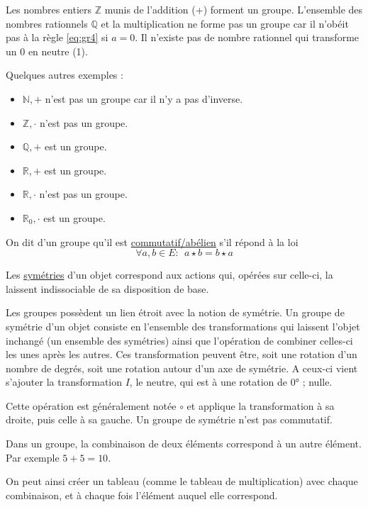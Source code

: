 \documentclass[a4paper]{article}
\begin{document}
    Les nombres entiers $\mathbb{Z}$ munis de l'addition (+) forment un groupe.
    L'ensemble des nombres rationnels $\mathbb{Q}$ et la multiplication ne forme
    pas un groupe car il n'obéit pas à la règle \ref{eq:gr4} si $a = 0$. Il
    n'existe pas de nombre rationnel qui transforme un 0 en neutre (1).

    Quelques autres exemples :
    \begin{itemize}
        \item $\mathbb{N}, +$ n'est pas un groupe car il n'y a pas d'inverse.
        \item $\mathbb{Z}, \cdot $ n'est pas un groupe.
        \item $\mathbb{Q}, +$ est un groupe.
        \item $\mathbb{R}, +$ est un groupe.
        \item $\mathbb{R}, \cdot$ n'est pas un groupe.
        \item $\mathbb{R}_0, \cdot$ est un groupe.

    \end{itemize}
    
    On dit d'un groupe qu'il est \underline{commutatif/abélien} s'il répond à la
    loi
    \begin{equation}
        \forall a, b \in E : \ \ a \star b = b \star a
    \end{equation}
    
    Les \underline{symétries} d'un objet correspond aux actions qui, opérées sur
    celle-ci, la laissent indissociable de sa disposition de base.

    Les groupes possèdent un lien étroit avec la notion de symétrie. Un groupe
    de symétrie d'un objet consiste en l'ensemble des transformations qui
    laissent l'objet inchangé (un ensemble des symétries) ainsi que l'opération
    de combiner celles-ci les unes après les autres. Ces transformation peuvent
    être, soit une rotation d'un nombre de degrés, soit une rotation autour
    d'un axe de symétrie. A ceux-ci vient s'ajouter la transformation $I$, 
    le neutre, qui est à une rotation de $0$° ; nulle.
    
    Cette opération est généralement notée $\circ$ et applique la transformation
    à sa droite, puis celle à sa gauche. Un groupe de symétrie n'est pas
    commutatif.

    Dans un groupe, la combinaison de deux éléments correspond à un autre
    élément. Par exemple $5 + 5 = 10$.

    On peut ainsi créer un tableau (comme le tableau de multiplication) avec
    chaque combinaison, et à chaque fois l'élément auquel elle correspond.
    
\end{document}
